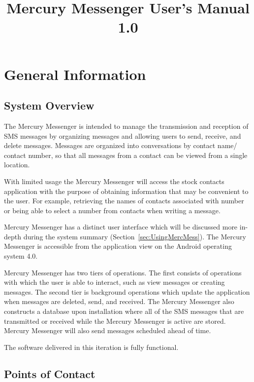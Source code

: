 \documentclass{article}
\begin{document}
\title{Mercury Messenger User's Manual 1.0}
\maketitle

\tableofcontents

\section{General Information}

\subsection{System Overview}
\par The Mercury Messenger is intended to manage the transmission and reception of SMS messages by organizing messages and allowing users to send, receive, and delete messages. Messages are organized into conversations by contact name/ contact number, so that all messages from a contact can be viewed from a single location.
\par With limited usage the Mercury Messenger will access the stock contacts application with the purpose of obtaining information that may be convenient to the user. For example, retrieving the names of contacts associated with number or being able to select a number from contacts when writing a message.
\par Mercury Messenger has a distinct user interface which will be discussed more in-depth during the system summary (Section~\ref{sec:UsingMercMess}). The Mercury Messenger is accessible from the application view on the Android operating system 4.0.
\par Mercury Messenger has two tiers of operations. The first consists of operations with which the user is able to interact, such as view messages or creating messages. The second tier is background operations which update the application when messages are deleted, send, and received. The Mercury Messenger also constructs a database upon installation where all of the SMS messages that are transmitted or received while the Mercury Messenger is active are stored. Mercury Messenger will also send messages scheduled ahead of time.
\par The software delivered in this iteration is fully functional.


\subsection{Points of Contact}
\end{document}
